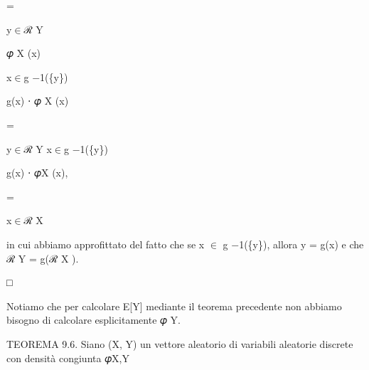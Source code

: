 \documentclass[a4paper,portrait,12pt]{article}
\begin{document}
=


\begin{flushleft}
y$\in$ℛ Y
\end{flushleft}





\begin{flushleft}
𝜑 X (x)
\end{flushleft}


\begin{flushleft}
x$\in$g $-$1(\{y\})
\end{flushleft}





\begin{flushleft}
g(x) ⋅ 𝜑 X (x)
\end{flushleft}





=


\begin{flushleft}
y$\in$ℛ Y x$\in$g $-$1(\{y\})
\end{flushleft}





\begin{flushleft}
g(x) ⋅ 𝜑X (x),
\end{flushleft}





=


\begin{flushleft}
x$\in$ℛ X
\end{flushleft}





\begin{flushleft}
in cui abbiamo approfittato del fatto che se x $\in$ g $-$1(\{y\}), allora y = g(x) e che ℛ Y = g(ℛ X ).
\end{flushleft}





□





\begin{flushleft}
Notiamo che per calcolare E[Y] mediante il teorema precedente non abbiamo bisogno di calcolare esplicitamente 𝜑 Y.
\end{flushleft}


\begin{flushleft}
TEOREMA 9.6. Siano (X, Y) un vettore aleatorio di variabili aleatorie discrete con densit\`{a} congiunta 𝜑X,Y
\end{flushleft}
\end{document}
